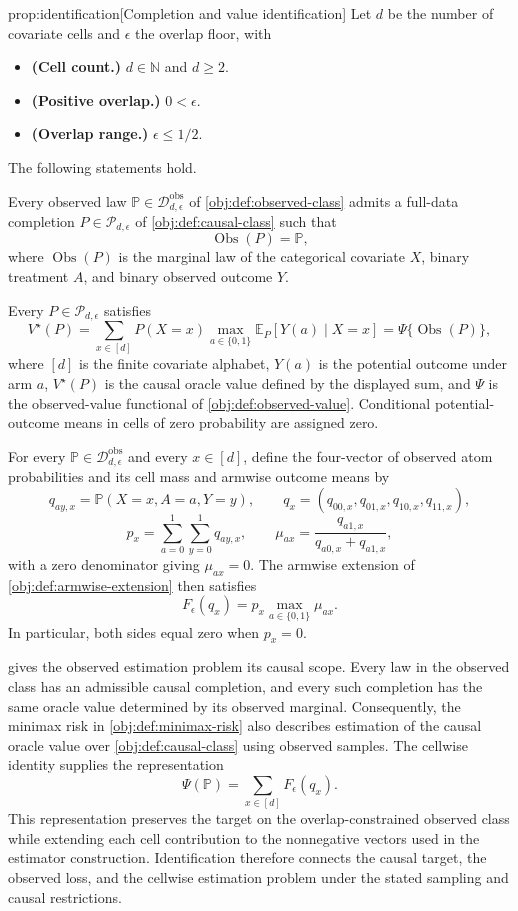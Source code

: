 \documentclass[11pt]{article}
\begin{document}
\begin{propositionv}{prop:identification}[Completion and value identification]
Let \(d\) be the number of covariate cells and \(\epsilon\) the overlap floor, with
\begin{itemize}
\item \textbf{(Cell count.)} \(d\in\mathbb N\) and \(d\ge 2\).
\item \textbf{(Positive overlap.)} \(0<\epsilon\).
\item \textbf{(Overlap range.)} \(\epsilon\le 1/2\).
\end{itemize}
The following statements hold.

Every observed law \(\mathbb P\in\mathcal D_{d,\epsilon}^{\mathrm{obs}}\) of \cref{obj:def:observed-class} admits a full-data completion \(P\in\mathcal P_{d,\epsilon}\) of \cref{obj:def:causal-class} such that
\[
\operatorname{Obs}(P)=\mathbb P,
\]
where \(\operatorname{Obs}(P)\) is the marginal law of the categorical covariate \(X\), binary treatment \(A\), and binary observed outcome \(Y\).

Every \(P\in\mathcal P_{d,\epsilon}\) satisfies
\[
V^\star(P)
=
\sum_{x\in[d]} P(X=x)
\max_{a\in\{0,1\}}
\mathbb E_P[Y(a)\mid X=x]
=
\Psi\{\operatorname{Obs}(P)\},
\]
where \([d]\) is the finite covariate alphabet, \(Y(a)\) is the potential outcome under arm \(a\), \(V^\star(P)\) is the causal oracle value defined by the displayed sum, and \(\Psi\) is the observed-value functional of \cref{obj:def:observed-value}. Conditional potential-outcome means in cells of zero probability are assigned zero.

For every \(\mathbb P\in\mathcal D_{d,\epsilon}^{\mathrm{obs}}\) and every \(x\in[d]\), define the four-vector of observed atom probabilities and its cell mass and armwise outcome means by
\[
q_{ay,x}=\mathbb P(X=x,A=a,Y=y),
\qquad
q_x=(q_{00,x},q_{01,x},q_{10,x},q_{11,x}),
\]
\[
p_x=\sum_{a=0}^{1}\sum_{y=0}^{1}q_{ay,x},
\qquad
\mu_{ax}=\frac{q_{a1,x}}{q_{a0,x}+q_{a1,x}},
\]
with a zero denominator giving \(\mu_{ax}=0\). The armwise extension of \cref{obj:def:armwise-extension} then satisfies
\[
F_\epsilon(q_x)=p_x\max_{a\in\{0,1\}}\mu_{ax}.
\]
In particular, both sides equal zero when \(p_x=0\).
\end{propositionv}

 gives the observed estimation problem its causal scope. Every law in the observed class has an admissible causal completion, and every such completion has the same oracle value determined by its observed marginal. Consequently, the minimax risk in \cref{obj:def:minimax-risk} also describes estimation of the causal oracle value over \cref{obj:def:causal-class} using observed samples. The cellwise identity supplies the representation
\[
\Psi(\mathbb P)=\sum_{x\in[d]}F_\epsilon(q_x).
\]
This representation preserves the target on the overlap-constrained observed class while extending each cell contribution to the nonnegative vectors used in the estimator construction. Identification therefore connects the causal target, the observed loss, and the cellwise estimation problem under the stated sampling and causal restrictions.
\end{document}
